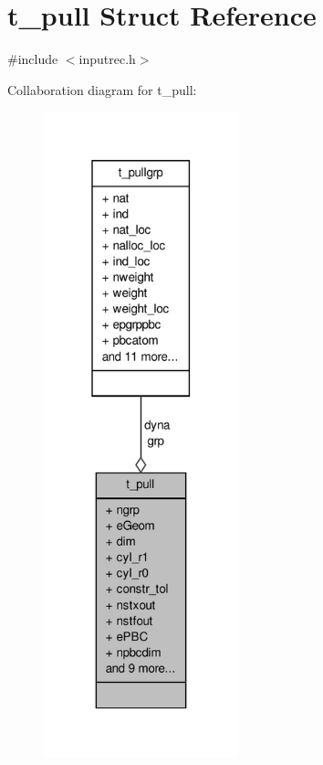 \hypertarget{structt__pull}{\section{t\-\_\-pull \-Struct \-Reference}
\label{structt__pull}
}


{\ttfamily \#include $<$inputrec.\-h$>$}



\-Collaboration diagram for t\-\_\-pull\-:
\nopagebreak
\begin{figure}[H]
\begin{center}
\leavevmode
\includegraphics[width=160pt]{structt__pull__coll__graph}
\end{center}
\end{figure}
